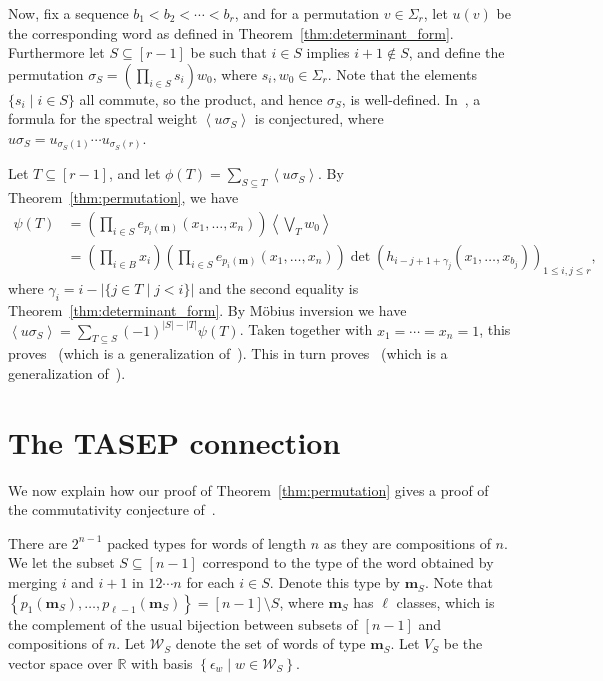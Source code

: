 \documentclass[reqno]{amsart}
\newcommand{\0}{\phantom{c}}
\newcommand{\swt}[1]{\left\langle #1 \right\rangle} %
\newcommand{\SymGp}[1]{\Sigma_{#1}} %
\newcommand{\mm}{\mathbf{m}}
\newcommand{\mcW}{\mathcal{W}}
\newcommand{\RR}{\mathbb{R}}
\let\sumnonlimits\sum
\let\prodnonlimits\prod
\renewcommand{\sum}{\sumnonlimits\limits}
\renewcommand{\prod}{\prodnonlimits\limits}
\newcommand{\set}[1]{\left\{ #1 \right\}}
\newcommand{\ive}[1]{\left[ #1 \right]}
\theoremstyle{plain}
\theoremstyle{definition}
\numberwithin{equation}{section}
\begin{document}
Now, fix a sequence $b_1 < b_2 < \cdots < b_r$, and for a permutation $v \in \SymGp{r}$, let $u(v)$ be the corresponding word as defined in Theorem~\ref{thm:determinant_form}.
Furthermore let $S \subseteq \ive{r-1}$ be such that $i\in S$ implies $i+1 \notin S$, and define the permutation $\sigma_S = \left( \prod_{i \in S} s_i \right) w_0$, where $s_i, w_0 \in \SymGp{r}$.
Note that the elements $\{s_i \mid i \in S\}$ all commute, so the product, and hence $\sigma_S$, is well-defined.
In~\cite{AasLin17}, a formula for the spectral weight $\swt{u \sigma_S}$ is conjectured, where $u \sigma_S = u_{\sigma_S(1)} \cdots u_{\sigma_S(r)}$.

Let $T \subseteq \ive{r-1}$, and let $\phi(T) = \sum_{S \subseteq T} \swt{u \sigma_S}$.
By Theorem~\ref{thm:permutation}, we have
\begin{align*}
  \psi(T) & = \left(\prod_{i\in S} e_{p_i(\mm)}(x_1, \dotsc, x_n) \right) \swt{ \bigvee_T w_0}
  \\ & = \left( \prod_{i\in B} x_i \right) \left(\prod_{i\in S} e_{p_i(\mm)}(x_1, \dotsc, x_n) \right) \det(h_{i-j+1+\gamma_j}(x_1, \dotsc, x_{b_j}))_{1\leq i,j \leq r},
\end{align*}
where $\gamma_i = i - \lvert \{j\in T \mid j < i \} \rvert$ and the second equality is Theorem~\ref{thm:determinant_form}.
By M\"obius inversion we have $\swt{u \sigma_S} = \sum_{T\subseteq S} (-1)^{|S|-|T|} \psi(T)$.
Taken together with $x_1 = \cdots = x_n = 1$, this proves~\cite[Conj.~3.10]{AasLin17} (which is a generalization of~\cite[Conj.~3.9]{AasLin17}).
This in turn proves~\cite[Conj.~3.6]{AasLin17} (which is a generalization of~\cite[Conj.~3.4]{AasLin17}).










\section{The TASEP connection}

We now explain how our proof of Theorem~\ref{thm:permutation} gives a proof of the commutativity conjecture of~\cite{AAMP}.

There are $2^{n-1}$ packed types for words of length $n$ as they are compositions of $n$.
We let the subset $S \subseteq [n-1]$ correspond to the type of the word obtained by merging $i$ and $i+1$ in $12 \dotsm n$ for each $i \in S$.
Denote this type by $\mm_S$.
Note that $\set{p_1(\mm_S), \dotsc, p_{\ell-1}(\mm_S)} = [n-1] \setminus S$, where $\mm_S$ has $\ell$ classes, which is the complement of the usual bijection between subsets of $\ive{n-1}$ and compositions of $n$.
Let $\mcW_S$ denote the set of words of type $\mm_S$.
Let $V_S$ be the vector space over $\RR$ with basis $\set{\epsilon_w \mid w \in \mcW_S}$.
\end{document}
